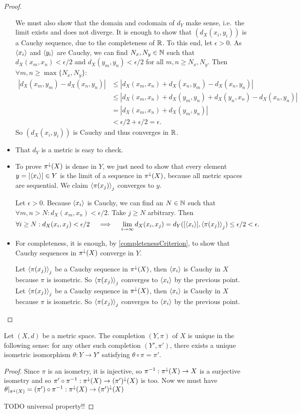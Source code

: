 \begin{proof}
\begin{itemize}
We must also show that the domain and codomain of $d_Y$ make sense, i.e.\ the limit exists and does not diverge. It is enough to show that $(d_X(x_i,y_i))$ is a Cauchy sequence, due to the completeness of $\mathbb{R}$. To this end, let $\epsilon>0$. As $\left\langle x_i \right\rangle$ and $\left\langle y_i \right\rangle$ are Cauchy, we can find $N_x,N_y\in\mathbb{N}$ such that $d_X(x_m,x_n)< \epsilon/2$ and $d_X(y_m,y_n) < \epsilon/2$ for all $m,n \geq N_x,N_y$. Then $\forall m,n \geq \max\{N_x,N_y\}$:
\begin{align*}
|d_X(x_m,y_m) - d_X(x_n,y_n)| &\leq |d_X(x_m,x_n)+d_X(x_n,y_m) - d_X(x_n,y_n)| \\
&\leq |d_X(x_m,x_n)+d_X(y_m,y_n)+ d_X(y_n,x_n) - d_X(x_n,y_n)| \\
&= |d_X(x_m,x_n)+d_X(y_m,y_n)| \\
&< \epsilon/2 + \epsilon/2= \epsilon.
\end{align*}
So $(d_X(x_i,y_i))$ is Cauchy and thus converges in $\mathbb{R}$.
\item That $d_Y$ is a metric is easy to check.
\item To prove $\pi^\downarrow(X)$ is dense in $Y$, we just need to show that every element $y = [\left\langle x_i \right\rangle]\in Y$ is the limit of a sequence in $\pi^\downarrow(X)$, because all metric spaces are sequential. We claim $\left\langle \pi(x_j) \right\rangle_j$ converges to $y$.

Let $\epsilon>0$. Because $\left\langle x_i \right\rangle$ is Cauchy, we can find an $N\in\mathbb{N}$ such that $\forall m,n>N: d_X(x_m,x_n) < \epsilon/2$. Take $j\geq N$ arbitrary. Then
\[ \forall i\geq N: d_X(x_i,x_j) < \epsilon/2 \quad \implies\quad \lim_{i\to\infty} d_X(x_i,x_j) = d_Y([\left\langle x_i \right\rangle],\left\langle \pi(x_j) \right\rangle_j) \leq \epsilon/2  < \epsilon. \]
\item For completeness, it is enough, by \ref{completenessCriterion}, to show that Cauchy sequences in $\pi^\downarrow(X)$ converge in $Y$.

Let $\left\langle \pi(x_j) \right\rangle_j$ be a Cauchy sequence in $\pi^\downarrow(X)$, then $\left\langle x_i \right\rangle$ is Cauchy in $X$ because $\pi$ is isometric. So $\left\langle \pi(x_j) \right\rangle_j$ converges to $\left\langle x_i \right\rangle$ by the previous point.
Let $\left\langle \pi(x_j) \right\rangle_j$ be a Cauchy sequence in $\pi^\downarrow(X)$, then $\left\langle x_i \right\rangle$ is Cauchy in $X$ because $\pi$ is isometric. So $\left\langle \pi(x_j) \right\rangle_j$ converges to $\left\langle x_i \right\rangle$ by the previous point.
\end{itemize}
\end{proof}

\begin{proposition} \label{universalPropertyCompletion}
Let $(X,d)$ be a metric space. The completion $(Y,\pi)$ of $X$ is unique in the following sense: for any other such completion $(Y',\pi')$, there exists a unique isometric isomorphism $\theta:Y\to Y'$ satisfying $\theta\circ \pi = \pi'$.
\end{proposition}
\begin{proof}
Since $\pi$ is an isometry, it is injective, so $\pi^{-1}:\pi^\downarrow(X)\to X$ is a surjective isometry and so $\pi'\circ\pi^{-1}:\pi^\downarrow(X)\to(\pi')^\downarrow(X)$ is too. Now we must have $\theta|_{\pi^\downarrow(X)} = (\pi')\circ\pi^{-1}:\pi^\downarrow(X)\to(\pi')^\downarrow(X)$ 

TODO universal property!!
\end{proof}

